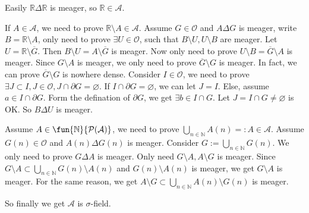 \documentclass{ctexart}
\begin{document}
\begin{solution}
  Easily \(\mathbb{R} \Delta \mathbb{R}\) is meager, so \(\mathbb{R} \in \mathcal{A}\). 

  If \(A \in \mathcal{A}\), we need to prove \(\mathbb{R} \setminus A \in \mathcal{A}\). 
  Assume \(G \in \mathcal{O}\) and \( A \Delta G\) is meager, write \(B=\mathbb{R}\setminus A\), 
  only need to prove \(\exists U \in \mathcal{O}\), such that \(B\setminus U,U\setminus B\) are meager. 
  Let \(U=\mathbb{R} \setminus \overline{G}\). Then \(B \setminus U = A \setminus \overline{G}\) is meager. 
  Now only need to prove \(U \setminus B = \overline{ G}\setminus A\) is meager. 
  Since \(G \setminus A\) is meager, we only need to prove \(\overline{G}\setminus G\) is meager. 
  In fact, we can prove \(\overline{G}\setminus G\) is nowhere dense. 
  Consider \(I \in \mathcal{O}\), we need to prove \(\exists J \subset I,J \in \mathcal{O}, J \cap \partial G = \varnothing\). 
  If \(I \cap \partial G = \varnothing\), we can let \(J = I\). 
  Else, assume \( a \in I \cap \partial G\). Form the defination of \(\partial G\), 
  we get \(\exists b \in I \cap G\). Let \(J = I \cap G \neq \varnothing\) is OK. 
  So \(B \Delta U\) is meager. 

  Assume \(A \in \fun{\mathbb{N}}{\mathcal{P}(\mathcal{A})}\), we need to prove \(\bigcup_{n \in \mathbb{N}} A(n)=:A \in \mathcal{A}\). 
  Assume \(G(n) \in \mathcal{O}\) and \(A(n) \Delta G(n)\) is meager. Consider \(G:= \bigcup_{ n \in \mathbb{N}} G(n)\). 
  We only need to prove \(G \Delta A\) is meager. Only need \(G \setminus A,A \setminus G\) is meager. 
  Since \(G \setminus A \subset \bigcup_{n \in \mathbb{N}} G(n) \setminus A(n)\) and \(G(n)\setminus A(n)\) is meager, we get \(G \setminus A\) is meager. 
  For the same reason, we get \(A \setminus G \subset \bigcup_{n \in \mathbb{N}} A(n)\setminus G(n)\) is meager. 

  So finally we get \(\mathcal{A}\) is \(\sigma\)-field. 
\end{solution}
\end{document}
